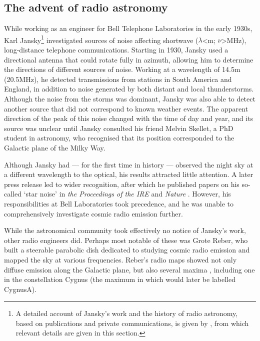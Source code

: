 \newpage
\subsection{The advent of radio astronomy}
\label{section: introduction: historical_context: radio_astronomy}

While working as an engineer for Bell Telephone Laboratories in the early 1930s, Karl Jansky\footnote{A detailed account of Jansky's work and the history of radio astronomy, based on publications and private communications, is given by \citet{Kellerman2023}, from which relevant details are given in this section.} investigated sources of noise affecting shortwave ($\lambda$\;\textless{}\;m; $\nu$\;\textgreater{}\;MHz), long-distance telephone communications. Starting in 1930, Jansky used a directional antenna that could rotate fully in azimuth, allowing him to determine the directions of different sources of noise. Working at a wavelength of 14.5\;m (20.5\;MHz), he detected transmissions from stations in South America and England, in addition to noise generated by both distant and local thunderstorms. Although the noise from the storms was dominant, Jansky was also able to detect another source that did not correspond to known weather events. The apparent direction of the peak of this noise changed with the time of day and year, and its source was unclear until Jansky consulted his friend Melvin Skellet, a PhD student in astronomy, who recognised that its position corresponded to the Galactic plane of the Milky Way.

Although Jansky had --- for the first time in history --- observed the night sky at a different wavelength to the optical, his results attracted little attention. A later press release led to wider recognition, after which he published papers on his so-called `star noise' in \textit{the Proceedings of the IRE} \citep{Jansky1933b} and \textit{Nature} \citep{Jansky1933a}. However, his responsibilities at Bell Laboratories took precedence, and he was unable to comprehensively investigate cosmic radio emission further.

While the astronomical community took effectively no notice of Jansky's work, other radio engineers did. Perhaps most notable of these was Grote Reber, who built a steerable parabolic dish dedicated to studying cosmic radio emission and mapped the sky at various frequencies. Reber's radio maps showed not only diffuse emission along the Galactic plane, but also several maxima \citep{Reber1944}, including one in the constellation Cygnus (the maximum in which would later be labelled Cygnus\;A).

